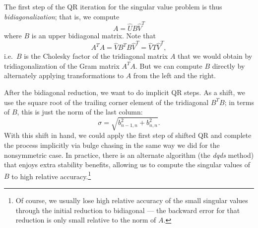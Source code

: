The first step of the QR iteration for the singular value problem is
thus {\em bidiagonalization}; that is, we compute
\[
  A = \hat{U} B \hat{V}^T
\]
where $B$ is an upper bidiagonal matrix.  Note that
\[
  A^T A = \hat{V} B^T B \hat{V}^T = \hat{V} T \hat{V}^T,
\]
i.e.~$B$ is the Cholesky factor of the tridiagonal matrix $A$ that
we would obtain by tridiagonalization of the Gram matrix $A^T A$.
But we can compute $B$ directly by alternately applying
transformations to $A$ from the left and the right.

After the bidiagonal reduction, we want to do implicit QR steps.
As a shift, we use the square root of the trailing
corner element of the tridiagonal $B^T B$; in terms of $B$, this is
just the norm of the last column:
\[
  \sigma = \sqrt{b_{n-1,n}^2 + b_{n,n}^2}.
\]
With this shift in hand, we could apply the first step of shifted
QR and complete the process implicitly via bulge chasing in the same
way we did for the nonsymmetric case.  In practice, there is an alternate
algorithm (the {\em dqds} method) that enjoys extra stability benefits,
allowing us to compute the singular values of $B$ to high relative
accuracy.\footnote{%
Of course, we usually lose high relative accuracy of the small singular
values through the initial reduction to
bidiagonal --- the backward error for that reduction is only small
relative to the norm of $A$.}
